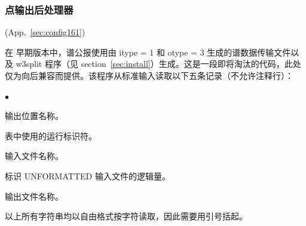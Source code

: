 \vsssub
\subsubsection{点输出后处理器} \label{sec:ww3outp}
\vsssub

 (App.~\ref{sec:config161})

\vspace{\baselineskip} 
\vspace{\baselineskip} 
\noindent 
在 \ws{} 早期版本中，谱公报使用由 {\F itype = 1} 和 {\F otype = 3} 生成的谱数据传输文件以及 {\file w3split} 程序（见 section~\ref{sec:install}）生成。这是一段即将淘汰的代码，此处仅为向后兼容而提供。该程序从标准输入读取以下五条记录（不允许注释行）：

\begin{list}{$\bullet$}{\itemsep 0mm \parsep 0mm}
\item 输出位置名称。
\item 表中使用的运行标识符。
\item 输入文件名称。
\item 标识 UNFORMATTED 输入文件的逻辑量。
\item 输出文件名称。
\end{list}

\noindent
以上所有字符串均以自由格式按字符读取，因此需要用引号括起。

\pb
